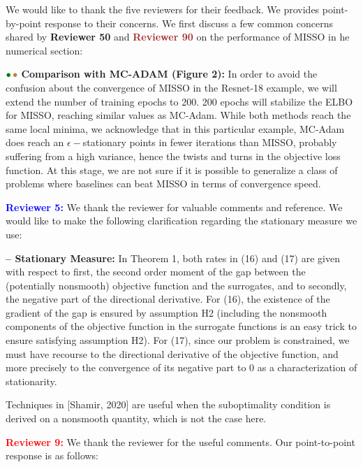 \documentclass{article}
\begin{document}
We would like to thank the five reviewers for their feedback. We provides point-by-point response to their concerns.
We first discuss a few common concerns shared by \textbf{\textcolor{green!50!black}{Reviewer 50}} and \textbf{\textcolor{brown}{Reviewer 90}} on the performance of MISSO in he numerical section:

\vspace{0.03in}
${\color{green!50!black}\bullet}\!~{\color{brown}\bullet}$ \textbf{Comparison with MC-ADAM (Figure 2):} 
In order to avoid the confusion about the convergence of MISSO in the Resnet-18 example, we will extend the number of training epochs to 200.
200 epochs will stabilize the ELBO for MISSO, reaching similar values as MC-Adam.
While both methods reach the same local minima, we acknowledge that in this particular example, MC-Adam does reach an $\epsilon-$stationary points in fewer iterations than MISSO, probably suffering from a high variance, hence the twists and turns in the objective loss function.
At this stage, we are not sure if it is possible to generalize a class of problems where baselines can beat MISSO in terms of convergence speed.

\medskip
\textbf{\textcolor{blue}{Reviewer 5:}} We thank the reviewer for valuable comments and reference. We would like to make the following clarification regarding the stationary measure we use: 

\vspace{0.03in}
\textbf{-- Stationary Measure:} In Theorem 1, both rates in (16) and (17) are given with respect to first, the second order moment of the gap between the (potentially nonsmooth) objective function and the surrogates, and to secondly, the negative part of the directional derivative.
For (16), the existence of the gradient of the gap is ensured by assumption H2 (including the nonsmooth components of the objective function in the surrogate functions is an easy trick to ensure satisfying assumption H2).
For (17), since our problem is constrained, we must have recourse to the directional derivative of the objective function, and more precisely to the convergence of its negative part to $0$ as a characterization of stationarity.

Techniques in [Shamir, 2020] are useful when the suboptimality condition is derived on a nonsmooth quantity, which is not the case here.


\medskip
\textbf{\textcolor{red}{Reviewer 9:}} We thank the reviewer for the useful comments. Our point-to-point response is as follows: 
\end{document}
